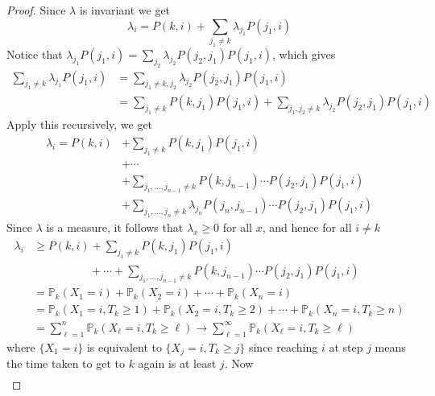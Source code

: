 \documentclass[a4paper,11pt]{article}
\begin{document}
\begin{proof}
    Since $\lambda$ is invariant we get
    \[
        \lambda_i =P(k, i) +\sum_{j_1 \neq k} \lambda_{j_1} P(j_1, i)
    \]
    Notice that $ \lambda_{j_1}P(j_1,i) = \sum_{j_2} \lambda_{j_2}P(j_{2},j_1)P(j_1,i) $, which gives 
    \begin{align*}
        \sum_{j_1 \neq k} \lambda_{j_1} P(j_1, i) &= \sum_{j_1\neq k, j_2}\lambda_{j_2}P(j_{2},j_1)P(j_1,i) \\ 
        &=  \sum_{j_1 \neq k} P\left(k, j_1\right) P\left(j_1, i\right)+ \sum_{j_1,j_2\neq k}\lambda_{j_2}P(j_{2},j_1)P(j_1,i)
    \end{align*}
    Apply this recursively, we get 
    \begin{align*}
        \lambda_i = P(k, i) &+\sum_{j_1 \neq k} P\left(k, j_1\right) P\left(j_1, i\right)\\ 
        &+\cdots\\ 
        &+\sum_{j_1, \ldots, j_{n-1} \neq k} P\left(k, j_{n-1}\right) \cdots P\left(j_2, j_1\right) P\left(j_1, i\right) \\
        &+\sum_{j_1, \ldots, j_n \neq k} \lambda_{j_n} P\left(j_n, j_{n-1}\right) \cdots P\left(j_2, j_1\right) P\left(j_1, i\right)
    \end{align*}
    Since $\lambda$ is a measure, it follows that $\lambda_x \geq 0$ for all $x$, and hence for all $i \neq k$
    \[
    \begin{aligned}
    \lambda_i & \geq P(k, i)+\sum_{j_1 \neq k} P\left(k, j_1\right) P\left(j_1, i\right)\\ 
    &\hspace{5em}+\cdots+\sum_{j_1, \ldots, j_{n-1} \neq k} P\left(k, j_{n-1}\right) \cdots P\left(j_2, j_1\right) P\left(j_1, i\right) \\
    &=\mathbb{P}_k\left(X_1=i\right)+\mathbb{P}_k\left(X_2=i\right)+\cdots+\mathbb{P}_k\left(X_n=i\right) \\
    &=\mathbb{P}_k\left(X_1=i, T_k \geq 1\right)+\mathbb{P}_k\left(X_2=i, T_k \geq 2\right)+\cdots+\mathbb{P}_k\left(X_n=i, T_k \geq n\right) \\
    &=\sum_{\ell=1}^n \mathbb{P}_k\left(X_{\ell}=i, T_k \geq \ell\right) \rightarrow \sum_{\ell=1}^{\infty} \mathbb{P}_k\left(X_{\ell}=i, T_k \geq \ell\right)
    \end{aligned}
    \]
    where $ \{X_1=i\} $ is equivalent to $\{X_j=i,T_k\ge j\}$ since reaching $i$ at step $j$ means the time taken to get to $k$ again is at least $j$. Now 
    \begin{align*}

\end{align*}
\end{proof}
\end{document}
